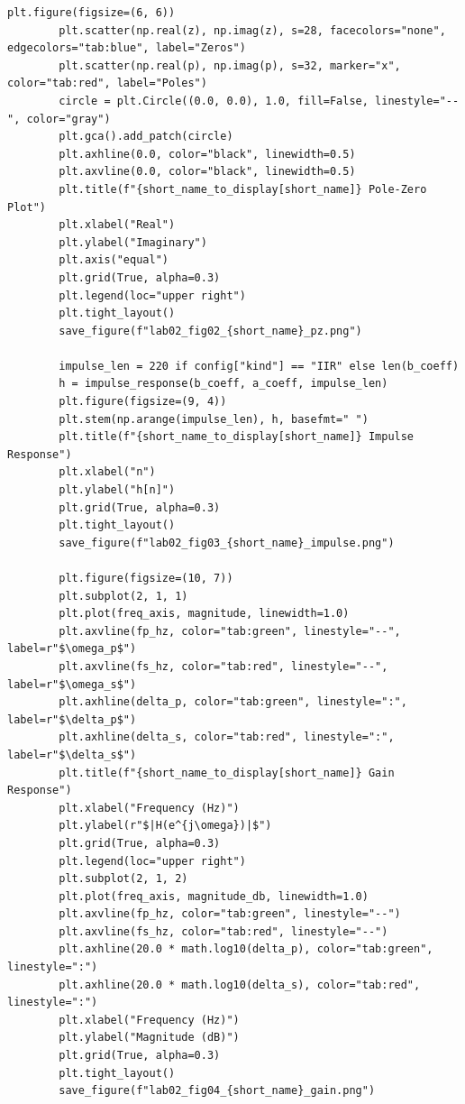 \documentclass[12pt, a4paper]{article}
\begin{document}
\begin{lstlisting}[caption={Loop that generates pole-zero, impulse, gain, phase, and group-delay figures.}, label={lst:lab02_plots}]
        plt.figure(figsize=(6, 6))
        plt.scatter(np.real(z), np.imag(z), s=28, facecolors="none", edgecolors="tab:blue", label="Zeros")
        plt.scatter(np.real(p), np.imag(p), s=32, marker="x", color="tab:red", label="Poles")
        circle = plt.Circle((0.0, 0.0), 1.0, fill=False, linestyle="--", color="gray")
        plt.gca().add_patch(circle)
        plt.axhline(0.0, color="black", linewidth=0.5)
        plt.axvline(0.0, color="black", linewidth=0.5)
        plt.title(f"{short_name_to_display[short_name]} Pole-Zero Plot")
        plt.xlabel("Real")
        plt.ylabel("Imaginary")
        plt.axis("equal")
        plt.grid(True, alpha=0.3)
        plt.legend(loc="upper right")
        plt.tight_layout()
        save_figure(f"lab02_fig02_{short_name}_pz.png")

        impulse_len = 220 if config["kind"] == "IIR" else len(b_coeff)
        h = impulse_response(b_coeff, a_coeff, impulse_len)
        plt.figure(figsize=(9, 4))
        plt.stem(np.arange(impulse_len), h, basefmt=" ")
        plt.title(f"{short_name_to_display[short_name]} Impulse Response")
        plt.xlabel("n")
        plt.ylabel("h[n]")
        plt.grid(True, alpha=0.3)
        plt.tight_layout()
        save_figure(f"lab02_fig03_{short_name}_impulse.png")

        plt.figure(figsize=(10, 7))
        plt.subplot(2, 1, 1)
        plt.plot(freq_axis, magnitude, linewidth=1.0)
        plt.axvline(fp_hz, color="tab:green", linestyle="--", label=r"$\omega_p$")
        plt.axvline(fs_hz, color="tab:red", linestyle="--", label=r"$\omega_s$")
        plt.axhline(delta_p, color="tab:green", linestyle=":", label=r"$\delta_p$")
        plt.axhline(delta_s, color="tab:red", linestyle=":", label=r"$\delta_s$")
        plt.title(f"{short_name_to_display[short_name]} Gain Response")
        plt.xlabel("Frequency (Hz)")
        plt.ylabel(r"$|H(e^{j\omega})|$")
        plt.grid(True, alpha=0.3)
        plt.legend(loc="upper right")
        plt.subplot(2, 1, 2)
        plt.plot(freq_axis, magnitude_db, linewidth=1.0)
        plt.axvline(fp_hz, color="tab:green", linestyle="--")
        plt.axvline(fs_hz, color="tab:red", linestyle="--")
        plt.axhline(20.0 * math.log10(delta_p), color="tab:green", linestyle=":")
        plt.axhline(20.0 * math.log10(delta_s), color="tab:red", linestyle=":")
        plt.xlabel("Frequency (Hz)")
        plt.ylabel("Magnitude (dB)")
        plt.grid(True, alpha=0.3)
        plt.tight_layout()
        save_figure(f"lab02_fig04_{short_name}_gain.png")


\end{lstlisting}
\end{document}
